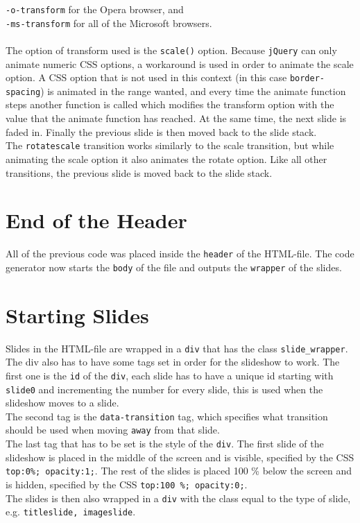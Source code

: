 \texttt{-o-transform} for the Opera browser, and \\
\texttt{-ms-transform} for all of the Microsoft browsers. \\ \\
The option of transform used is the \texttt{scale()} option. Because \texttt{jQuery} can only animate numeric CSS options, a workaround is used in order to animate the scale option. A CSS option that is not used in this context (in this case \texttt{border-spacing}) is animated in the range wanted, and every time the animate function steps another function is called which modifies the transform option with the value that the animate function has reached. At the same time, the next slide is faded in. Finally the previous slide is then moved back to the slide stack. \\
The \texttt{rotatescale} transition works similarly to the scale transition, but while animating the scale option it also animates the rotate option. Like all other transitions, the previous slide is moved back to the slide stack.

\section{End of the Header}
All of the previous code was placed inside the \texttt{header} of the HTML-file. The code generator now starts the \texttt{body} of the file and outputs the \texttt{wrapper} of the slides.

\section{Starting Slides}
Slides in the HTML-file are wrapped in a \texttt{div} that has the class \texttt{slide\_wrapper}. The div also has to have some tags set in order for the slideshow to work. The first one is the \texttt{id} of the \texttt{div}, each slide has to have a unique id starting with \texttt{slide0} and incrementing the number for every slide, this is used when the slideshow moves to a slide. \\
The second tag is the \texttt{data-transition} tag, which specifies what transition should be used when moving \texttt{away} from that slide. \\
The last tag that has to be set is the style of the \texttt{div}. The first slide of the slideshow is placed in the middle of the screen and is visible, specified by the CSS \texttt{top:0\%; opacity:1;}. The rest of the slides is placed 100 \% below the screen and is hidden, specified by the CSS \texttt{top:100 \%; opacity:0;}. \\
The slides is then also wrapped in a \texttt{div} with the class equal to the type of slide, e.g. \lstinline!titleslide, imageslide!.

